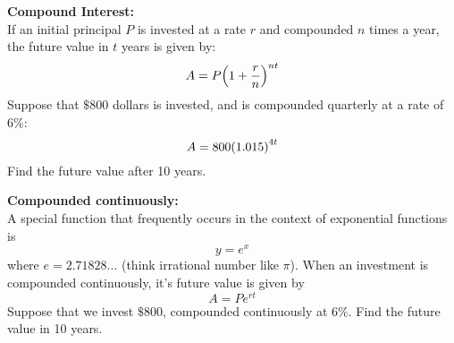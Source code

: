 \documentclass[../mathNotesPreamble]{subfiles}
\begin{document}
  \begin{ex*}
    \textbf{Compound Interest:}\\
    If an initial principal $P$ is invested at a rate $r$ and compounded $n$ times a year, the future value in $t$ years is given by:
      \[A=P{\left(1+\frac{r}{n}\right)}^{nt}\]
    Suppose that $\$800$ dollars is invested, and is compounded quarterly at a rate of $6\%$:
      \[A=800{\left(1.015\right)}^{4t}\]
    Find the future value after 10 years.
  \end{ex*}
    
  \begin{ex*}
    \textbf{Compounded continuously:}\\
    A special function that frequently occurs in the context of exponential functions is 
      \[y=e^x\]
    where $e= 2.71828...$ (think irrational number like $\pi$). When an investment is compounded continuously, it's future value is given by
      \[A=Pe^{rt}\]
    Suppose that we invest $\$800$, compounded continuously at $6\%$. Find the future value in 10 years.
  \end{ex*}
  \pagebreak
  

  \pagebreak
\end{document}
